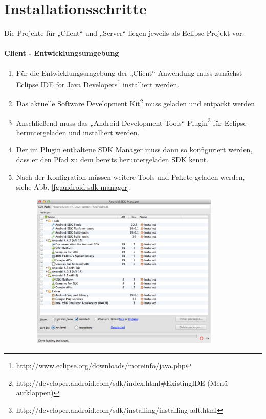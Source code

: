 
\section{Installationsschritte}

Die Projekte für „Client“ und „Server“ liegen jeweils als Eclipse Projekt vor.\\

\paragraph{Client - Entwicklungsumgebung}

\begin{enumerate}
	\item Für die Entwicklungsumgebung der „Client“ Anwendung muss zunächst Eclipse IDE for Java Developers\footnote{http://www.eclipse.org/downloads/moreinfo/java.php} installiert werden.
	\item Das aktuelle Software Development Kit\footnote{http://developer.android.com/sdk/index.html\#ExistingIDE (Menü aufklappen)} muss geladen und entpackt werden
	\item Anschließend muss das „Android Development Tools“ Plugin\footnote{http://developer.android.com/sdk/installing/installing-adt.html} für Eclipse heruntergeladen und installiert werden.
	\item Der im Plugin enthaltene SDK Manager muss dann so konfiguriert werden, dass er den Pfad zu dem bereits heruntergeladen SDK kennt.
	\item Nach der Konfigration müssen weitere Tools und Pakete geladen werden, siehe Abb. \ref{fg:android-sdk-manager}.
	\begin{figure}[H]
		\centering
		\includegraphics[width=0.85\textwidth]{./images/install/android-sdk-manager.png}

\end{figure}
\end{enumerate}
